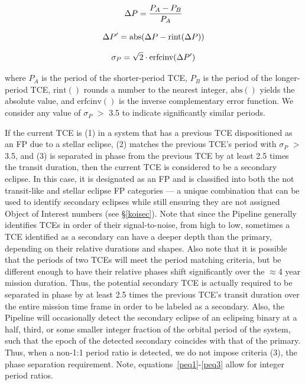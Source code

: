 \begin{equation}
\label{peq1}
\Delta P = \frac{P_{A}-P_{B}}{P_{A}}\\
\end{equation}

\begin{equation}
\label{peq2}
\Delta P^{\prime} = \textrm{abs}(\Delta P - \textrm{rint}(\Delta P))\\
\end{equation}

\begin{equation}
\label{peq3}
\sigma_{P} = \sqrt{2}\cdot\textrm{erfcinv}(\Delta P^{\prime})\\
\end{equation}

\noindent where $P_{A}$ is the period of the shorter-period TCE, $P_{B}$ is the period of the longer-period TCE, $\mathrm{rint()}$ rounds a number to the nearest integer, $\mathrm{abs()}$ yields the absolute value, and $\mathrm{erfcinv()}$ is the inverse complementary error function. We consider any value of $\sigma_{P}$ $>$ 3.5 to indicate significantly similar periods.

If the current TCE is (1) in a system that has a previous TCE dispositioned as an FP due to a stellar eclipse, (2) matches the previous TCE's period with $\sigma_{P}$ $>$ 3.5, and (3) is separated in phase from the previous TCE by at least 2.5 times the transit duration, then the current TCE is considered to be a secondary eclipse. In this case, it is designated as an FP and is classified into both the not transit-like and stellar eclipse FP categories --- a unique combination that can be used to identify secondary eclipses while still ensuring they are not assigned \kepler{} Object of Interest numbers (see \S\ref{koisec}). Note that since the \kepler{} Pipeline generally identifies TCEs in order of their signal-to-noise, from high to low, sometimes a TCE identified as a secondary can have a deeper depth than the primary, depending on their relative durations and shapes. Also note that it is possible that the periods of two TCEs will meet the period matching criteria, but be different enough to have their relative phases shift significantly over the $\approx$4 year mission duration. Thus, the potential secondary TCE is actually required to be separated in phase by at least 2.5 times the previous TCE's transit duration over the entire mission time frame in order to be labeled as a secondary. Also, the \kepler{} Pipeline will occasionally detect the secondary eclipse of an eclipsing binary at a half, third, or some smaller integer fraction of the orbital period of the system, such that the epoch of the detected secondary coincides with that of the primary. Thus, when a non-1:1 period ratio is detected, we do not impose criteria (3), the phase separation requirement. Note, equations~\ref{peq1}-\ref{peq3} allow for integer period ratios.




